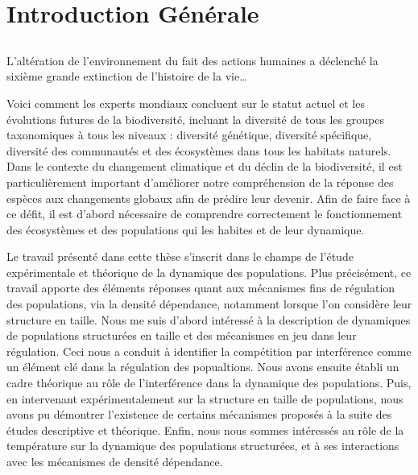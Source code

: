 \part{Introduction Générale}

\chapter*[Introduction]{}

\vspace{-5cm}

\og L'altération de l'environnement du fait des actions
humaines a déclenché la sixième grande extinction de l'histoire de la vie\ldots\fg
\autocite{stuart-chapin-iii2000a}

Voici comment les experts mondiaux concluent sur le statut actuel et les
évolutions futures de la biodiversité, incluant la diversité de tous les groupes
taxonomiques à tous les niveaux : diversité génétique, diversité spécifique,
diversité des communautés et des écosystèmes dans tous les habitats naturels.
Dans le contexte du changement climatique et du déclin de la biodiversité, il
est particulièrement important d'améliorer notre compréhension de la réponse
des espèces aux changements globaux afin de prédire leur devenir. Afin de faire
face à ce défit, il est d'abord nécessaire de comprendre correctement le
fonctionnement des écosystèmes et des populations qui les habites et de leur
dynamique. 

Le travail présenté dans cette thèse s'inscrit dans le champs de l'étude
expérimentale et théorique de la dynamique des populations. Plus précisément, ce
travail apporte des éléments réponses quant aux mécanismes fins de régulation
des populations, via la densité dépendance, notamment lorsque l'on considère
leur structure en taille.
Nous me suis d'abord intéressé à la description de dynamiques
de populations structurées en taille et des mécanismes en jeu dans leur
régulation. Ceci nous a conduit à identifier la compétition par interférence
comme un élément clé dans la régulation des popualtions.
Nous avons ensuite établi un cadre théorique au rôle de l'interférence dans la
dynamique des populations. Puis, en intervenant expérimentalement sur la 
structure en taille de populations, nous avons pu démontrer 
l'existence de certains mécanismes proposés à la suite des études descriptive et
théorique.
Enfin, nous nous sommes intéressés au rôle de la température sur la dynamique
des populations structurées, et à ses interactions avec les mécanismes de densité
dépendance.








